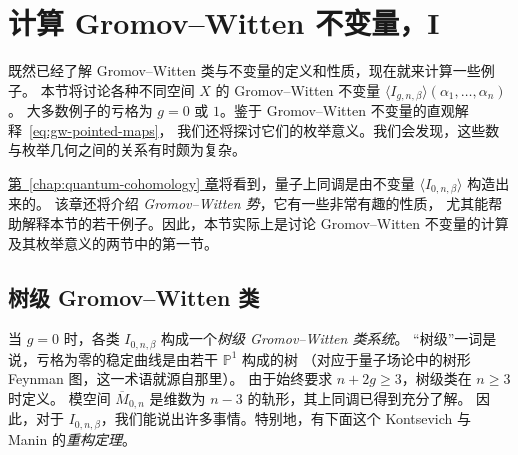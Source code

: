 \hypertarget{source:219-batch5}{}
\section{计算 Gromov--Witten 不变量，I}\label{sec:computing-gw-i}
既然已经了解 Gromov--Witten 类与不变量的定义和性质，现在就来计算一些例子。
本节将讨论各种不同空间 $X$ 的 Gromov--Witten 不变量
$\langle I_{g,n,\beta}\rangle(\alpha_1,\ldots,\alpha_n)$。
大多数例子的亏格为 $g=0$ 或 $1$。鉴于 Gromov--Witten 不变量的直观解释~\eqref{eq:gw-pointed-maps}，
我们还将探讨它们的枚举意义。我们会发现，这些数与枚举几何之间的关系有时颇为复杂。

\hyperref[chap:quantum-cohomology]{第~\ref*{chap:quantum-cohomology} 章}将看到，量子上同调是由不变量 $\langle I_{0,n,\beta}\rangle$ 构造出来的。
该章还将介绍 \emph{Gromov--Witten 势}，它有一些非常有趣的性质，
尤其能帮助解释本节的若干例子。因此，本节实际上是讨论 Gromov--Witten 不变量的计算及其枚举意义的两节中的第一节。

\subsection{树级 Gromov--Witten 类}\label{subsec:tree-level-gw}
当 $g=0$ 时，各类 $I_{0,n,\beta}$ 构成一个\emph{树级 Gromov--Witten 类系统}。
“树级”一词是说，亏格为零的稳定曲线是由若干 $\mathbb P^1$ 构成的树
（对应于量子场论中的树形 Feynman 图，这一术语就源自那里）。
由于始终要求 $n+2g\geq3$，树级类在 $n\geq3$ 时定义。
模空间 $\overline M_{0,n}$ 是维数为 $n-3$ 的轨形，其上同调已得到充分了解。
因此，对于 $I_{0,n,\beta}$，我们能说出许多事情。特别地，有下面这个 Kontsevich 与 Manin 的\emph{重构定理}。

